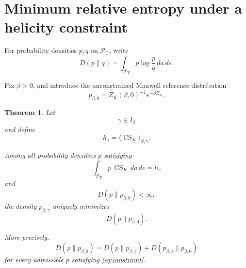 \documentclass[11pt]{article}
\newtheorem{theorem}{Theorem}
\theoremstyle{definition}
\theoremstyle{remark}
\newcommand{\CS}{\operatorname{CS}}
\begin{document}
\section{Minimum relative entropy under a helicity constraint}

For probability densities \(p,q\) on
\(\mathcal P_{\mathrm T}\), write
\begin{equation}
D(p\|q)
=
\int_{\mathcal P_{\mathrm T}}
p\log\frac{p}{q}
\,da\,de.
\label{eq:KL}
\end{equation}

Fix \(\beta>0\), and introduce the unconstrained Maxwell
reference distribution
\begin{equation}
p_{\beta,0}
=
Z_K(\beta,0)^{-1}
e^{-\beta E_K}.
\label{eq:reference}
\end{equation}

\begin{theorem}
\label{thm:min-relative}
Let
\begin{equation}
\gamma\in I_\beta
\end{equation}
and define
\begin{equation}
h_\gamma
=
\langle\CS_K\rangle_{\beta,\gamma}.
\label{eq:h-gamma}
\end{equation}

Among all probability densities \(p\) satisfying
\begin{equation}
\int_{\mathcal P_{\mathrm T}}
p\,\CS_K\,da\,de
=
h_\gamma
\label{eq:constraint}
\end{equation}
and
\begin{equation}
D(p\|p_{\beta,0})<\infty,
\end{equation}
the density \(p_{\beta,\gamma}\) uniquely minimizes
\begin{equation}
D(p\|p_{\beta,0}).
\end{equation}

More precisely,
\begin{equation}
D(p\|p_{\beta,0})
=
D(p\|p_{\beta,\gamma})
+
D(p_{\beta,\gamma}\|p_{\beta,0})
\label{eq:pythagoras}
\end{equation}
for every admissible \(p\) satisfying
\eqref{eq:constraint}.
\end{theorem}
\end{document}
